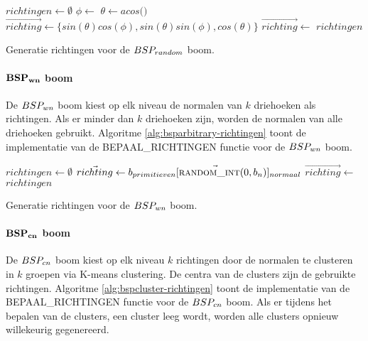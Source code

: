 \begin{dutchalgorithm}
    \begin{algorithmic}       
            \State $richtingen \gets \emptyset$
                    \State $\phi \gets $ 
                    \State $\theta \gets acos($$)$
                    \State $\vec{richting} \gets \{ sin(\theta)cos(\phi), sin(\theta)sin(\phi), cos(\theta) \}$
                    \State $\vec{richting} \gets $ 
                    \State {}
            \EndFor
            \State \Return $richtingen$
        \EndFunction
    \end{algorithmic}
    \caption{Generatie richtingen voor de $BSP_{random}$  boom.}
    \label{alg:bsprandom-richtingen}
\end{dutchalgorithm}

\paragraph{$\mathbf{BSP_{wn}}$ boom}
De $BSP_{wn}$ boom kiest op elk niveau de normalen van $k$ driehoeken als richtingen.
Als er minder dan $k$ driehoeken zijn, worden de normalen van alle driehoeken gebruikt.
Algoritme \ref{alg:bsparbitrary-richtingen} toont de implementatie van de BEPAAL\_RICHTINGEN functie voor de $BSP_{wn}$ boom.

\begin{dutchalgorithm}
    \begin{algorithmic}       
            \State $richtingen \gets \emptyset$
                    \State $\vec{richting} \gets \vec{b_{primitieven}[\Call{random\_int}{0, b_n}]_{normaal}}$
                    \State $\vec{richting} \gets $ 
                    \State {}
            \EndWhile
            \State \Return $richtingen$
        \EndFunction
    \end{algorithmic}
    \caption{Generatie richtingen voor de $BSP_{wn}$  boom.}
    \label{alg:bsparbitrary-richtingen}
\end{dutchalgorithm}

\paragraph{$\mathbf{BSP_{cn}}$ boom}
De $BSP_{cn}$ boom kiest op elk niveau $k$ richtingen door de normalen te clusteren in $k$ groepen via K-means clustering.
De centra van de clusters zijn de gebruikte richtingen.
Algoritme \ref{alg:bspcluster-richtingen} toont de implementatie van de BEPAAL\_RICHTINGEN functie voor de $BSP_{cn}$ boom.
Als er tijdens het bepalen van de clusters, een cluster leeg wordt, worden alle clusters opnieuw willekeurig gegenereerd.\\

